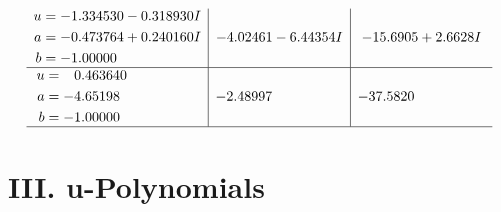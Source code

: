 \documentclass[1p]{elsarticle_modified}
\theoremstyle{definition}
\begin{document}
$$\begin{array}{c|c|c}
\begin{aligned}
u &= -1.334530 - 0.318930 I \\
a &= -0.473764 + 0.240160 I \\
b &= -1.00000\phantom{ +0.000000I}\end{aligned}
 & -4.02461 - 6.44354 I & -15.6905 + 2.6628 I \\ \hline\begin{aligned}
u &= \phantom{-}0.463640\phantom{ +0.000000I} \\
a &= -4.65198\phantom{ +0.000000I} \\
b &= -1.00000\phantom{ +0.000000I}\end{aligned}
 & -2.48997\phantom{ +0.000000I} & -37.5820\phantom{ +0.000000I}\\
 \hline 
 \end{array}$$\newpage
\newpage\renewcommand{\arraystretch}{1}
\centering \section*{ III. u-Polynomials}
\end{document}

